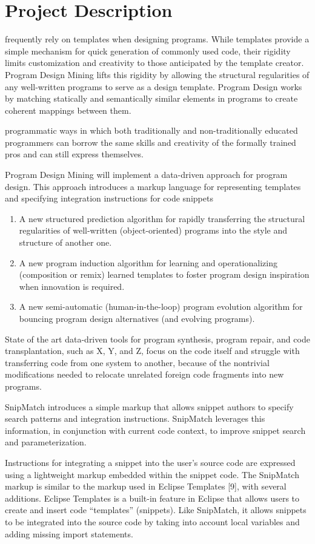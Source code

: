 \chapter{Project Description}{}
\label{sec:related}

 frequently rely on templates when designing 
programs. While templates provide a simple mechanism for quick generation of 
commonly used code, their rigidity limits customization and creativity 
to those anticipated by the template creator. Program Design Mining lifts 
this rigidity by allowing the structural regularities of any well-written 
programs to serve as a design template. Program Design works by matching 
statically and semantically similar elements in programs to create coherent 
mappings between them.


programmatic ways in which both traditionally and 
non-traditionally educated programmers can borrow the same skills and 
creativity of the formally trained pros and can still express themselves.  

Program Design Mining will implement a data-driven approach for 
program design. This approach introduces a markup language for 
representing templates and specifying integration instructions 
for code snippets

\begin{enumerate}
	\item A new structured prediction algorithm for rapidly transferring 
	the structural regularities of well-written (object-oriented) programs 
	into the style and structure of another one.
	\item A new program induction algorithm for learning and operationalizing 
	(composition or remix) learned templates to foster program design 
	inspiration when innovation is required.
	\item A new semi-automatic (human-in-the-loop) program evolution algorithm 
	for bouncing program design alternatives (and evolving programs). 
\end{enumerate}

State of the art data-driven tools for program synthesis, program 
repair, and code transplantation, such as X, Y, and Z, focus 
on the code itself and struggle with transferring code from one system 
to another, because of the nontrivial modifications needed to relocate 
unrelated foreign code fragments into new programs. 

SnipMatch introduces a simple markup that allows snippet
authors to specify search patterns and integration instructions.
SnipMatch leverages this information, in conjunction
with current code context, to improve snippet search and
parameterization. 


Instructions for integrating a snippet into the user’s source
code are expressed using a lightweight markup embedded
within the snippet code. The SnipMatch markup is similar
to the markup used in Eclipse Templates [9], with several
additions. Eclipse Templates is a built-in feature in Eclipse
that allows users to create and insert code “templates”
(snippets). Like SnipMatch, it allows snippets to be integrated
into the source code by taking into account local
variables and adding missing import statements. 